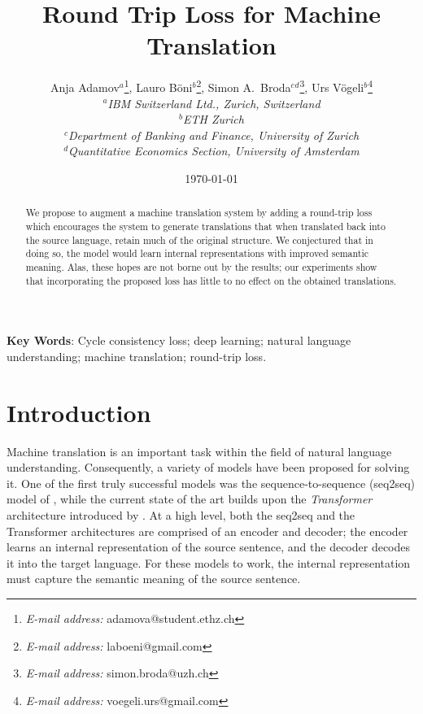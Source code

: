 \documentclass[11pt,a4paper]{article}
\begin{document}
\title{Round Trip Loss for Machine Translation}
\date{\today}
\author{
Anja Adamov$\mbox{}^a$\thanks{\emph{E-mail address:} adamova@student.ethz.ch},
Lauro B\"{o}ni$\mbox{}^b$\thanks{\emph{E-mail address:} laboeni@gmail.com},
Simon A.\ Broda$\mbox{}^c\mbox{}^d$\thanks{\emph{E-mail address:} simon.broda@uzh.ch},
Urs V\"{o}geli$\mbox{}^b$\thanks{\emph{E-mail address:} voegeli.urs@gmail.com}
\medskip \\
\textit{\small $\mbox{}^a$IBM Switzerland Ltd., Zurich, Switzerland}
\medskip \\
\textit{\small $\mbox{}^b$ETH Zurich}
\medskip \\
\textit{\small $\mbox{}^c$Department of Banking and Finance, University of Zurich}
\medskip \\
\textit{\small $\mbox{}^d$Quantitative Economics Section, University of Amsterdam}
}
\maketitle \setcounter{page}{0}\thispagestyle{empty}
\begin{abstract}
We propose to augment a machine translation system by adding a round-trip loss which encourages the system to generate translations that when translated back into the source language, retain much of the original structure. We conjectured that in doing so, the model would learn internal representations with improved semantic meaning. Alas, these hopes are not borne out by the results; our experiments show that incorporating the proposed loss has little to no effect on the obtained translations.
\end{abstract}
\bigskip \textbf{Key Words}: Cycle consistency loss; deep learning; natural language understanding; machine translation; round-trip loss.
\newpage
\setcounter{page}{1}
\section{Introduction}
Machine translation is an important task within the field of natural language understanding. Consequently, a variety of models have been proposed for solving it. One of the first truly successful models was the sequence-to-sequence (seq2seq) model of \citet{seq2seq}, while the current state of the art builds upon the \emph{Transformer} architecture introduced by \citet{transformer}. At a high level, both the seq2seq and the Transformer architectures are comprised of an encoder and decoder; the encoder learns an internal representation of the source sentence, and the decoder decodes it into the target language. For these models to work, the internal representation must capture the semantic meaning of the source sentence.
\end{document}
